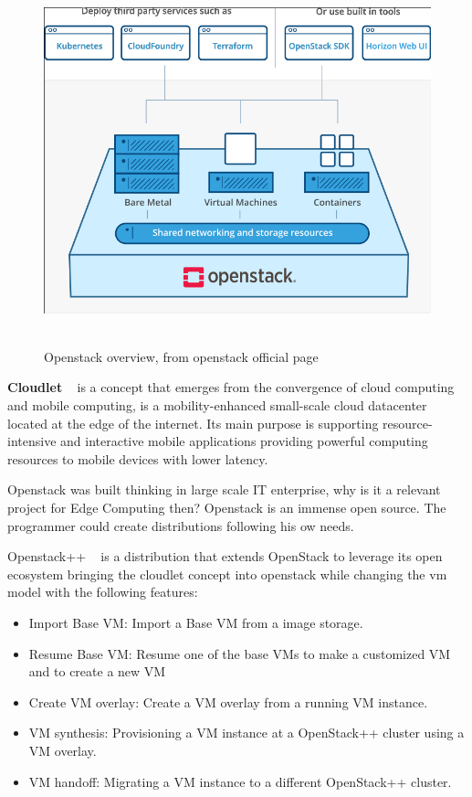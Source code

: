 \begin{figure}[h]%
    \includegraphics[width=6.0in]{figures/openstack.png}
~\caption{Openstack overview, from openstack official page}
\label{figure2.2}
\end{figure}

\newpage

\textbf{Cloudlet} ~\cite{cloudlet_def} is a concept that emerges from the convergence of cloud computing and mobile computing, is a mobility-enhanced small-scale cloud datacenter located at the edge of the internet. Its main purpose is supporting resource-intensive and interactive mobile applications providing powerful computing resources to mobile devices with lower latency.

Openstack was built thinking in large scale IT enterprise, why is it a relevant project for Edge Computing then? Openstack is an immense open source. The programmer could create distributions following his ow needs.

Openstack++ ~\cite{Cloudlet:2015} is a distribution that extends OpenStack to leverage its open ecosystem bringing the cloudlet concept into openstack while changing the vm model with the following features:

\begin{itemize}
    \item Import Base VM: Import a Base VM from a image storage.
    \item Resume Base VM: Resume one of the base VMs to make a customized VM and to create a new VM
    \item Create VM overlay: Create a VM overlay from a running VM instance.
    \item VM synthesis: Provisioning a VM instance at a OpenStack++ cluster using a VM overlay.
    \item VM handoff: Migrating a VM instance to a different OpenStack++ cluster.
\end{itemize}

